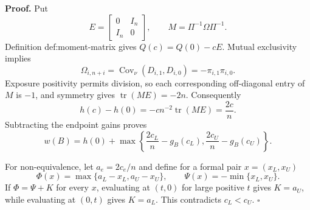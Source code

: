 \textbf{Proof.}
Put
\[
E=\begin{bmatrix}0&I_n\\I_n&0\end{bmatrix},
\qquad M=\Pi^{-1}\Omega\Pi^{-1}.
\]
Definition def:moment-matrix gives \(Q(c)=Q(0)-cE\).  Mutual exclusivity implies
\[
\Omega_{i,n+i}=\operatorname{Cov}_\nu(D_{i,1},D_{i,0})
=-\pi_{i,1}\pi_{i,0}.
\]
Exposure positivity permits division, so each corresponding off-diagonal entry of \(M\) is \(-1\), and symmetry gives \(\operatorname{tr}(ME)=-2n\).  Consequently
\[
h(c)-h(0)=-cn^{-2}\operatorname{tr}(ME)=\frac{2c}{n}.
\]
Subtracting the endpoint gains proves
\[
w(B)=h(0)+\max\left\{\frac{2c_L}{n}-g_B(c_L),
\frac{2c_U}{n}-g_B(c_U)\right\}.
\]

For non-equivalence, let \(a_e=2c_e/n\) and define for a formal pair \(x=(x_L,x_U)\)
\[
\Phi(x)=\max\{a_L-x_L,a_U-x_U\},
\qquad \Psi(x)=-\min\{x_L,x_U\}.
\]
If \(\Phi=\Psi+K\) for every \(x\), evaluating at \((t,0)\) for large positive \(t\) gives \(K=a_U\), while evaluating at \((0,t)\) gives \(K=a_L\).  This contradicts \(c_L<c_U\). \(\square\)